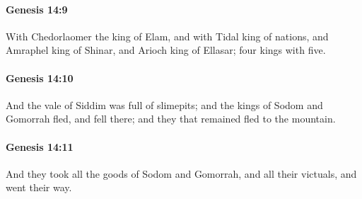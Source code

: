 		\paragraph{Genesis 14:9} %
			\label{GENESIS-14-9}

			With Chedorlaomer the king of Elam, and with Tidal king of nations, and Amraphel king of Shinar, and Arioch king of Ellasar; four kings with five.


		\paragraph{Genesis 14:10} %
			\label{GENESIS-14-10}

			And the vale of Siddim was full of slimepits; and the kings of Sodom and Gomorrah fled, and fell there; and they that remained fled to the mountain.


		\paragraph{Genesis 14:11} %
			\label{GENESIS-14-11}

			And they took all the goods of Sodom and Gomorrah, and all their victuals, and went their way.


